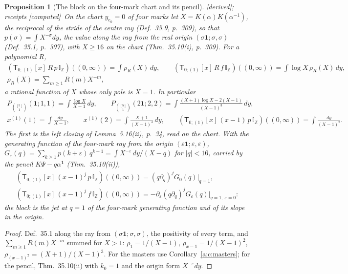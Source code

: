 \documentclass[11pt]{article}
\newcommand{\one}{\mathbf 1}
\newcommand{\sT}{\mathsf T}
\newcommand{\IZ}{\mathbb I_{\mathbb Z}}
\newcommand{\Tx}[3]{(\sT_{#1;(1)}[x]\,#2)((#3,\infty))}
\theoremstyle{plain}
\newtheorem{proposition}{Proposition}[section]
\theoremstyle{definition}
\theoremstyle{remark}
\newcommand{\derived}{\textup{[derived]}}
\newcommand{\computed}{\textup{[computed]}}
\begin{document}
\begin{proposition}[The block on the four-mark chart and its pencil]\label{a:p:chart}\derived; receipts \computed\
On the chart $y_{e_0}=0$ of four marks let $X=K(\alpha)K(\alpha^{-1})$, the reciprocal of the stride of the centre ray (Def.~35.9, p.~309), so that $p(\sigma)=\int X^{-\sigma}dy$, the value along the ray from the real origin $(\sigma\one;\sigma,\sigma)$ (Def.~35.1, p.~307), with $X\ge16$ on the chart (Thm.~35.10(i), p.~309). For a polynomial $R$,
\begin{gather*}
\Tx{0}{R\,p\,\IZ}{0}=\int\rho_R(X)\,dy,\qquad\Tx{0}{R\,f\,\IZ}{0}=\int\log X\,\rho_R(X)\,dy,\\
\rho_R(X)=\sum_{m\ge1}R(m)X^{-m},
\end{gather*}
a rational function of $X$ whose only pole is $X=1$. In particular
\begin{gather*}
P_{\binom{[5]}1}(\one;1,1)=\int\frac{\log X}{X-1}\,dy,\qquad P_{\binom{[5]}1}(2\one;2,2)=\int\frac{(X+1)\log X-2(X-1)}{(X-1)^3}\,dy,\\
x^{(1)}(1)=\int\frac{dy}{X-1},\qquad x^{(1)}(2)=\int\frac{X+1}{(X-1)^3}\,dy,\qquad \Tx{0}{(x-1)\,p\,\IZ}{0}=\int\frac{dy}{(X-1)^2}.
\end{gather*}
The first is the left closing of Lemma~5.16(ii), p.~34, read on the chart. With the generating function of the four-mark ray from the origin $(\varepsilon\one;\varepsilon,\varepsilon)$, $G_\varepsilon(q)=\sum_{k\ge1}p(k+\varepsilon)\,q^{k-1}=\int X^{-\varepsilon}\,dy/(X-q)$ for $|q|<16$, carried by the pencil $K\Psi-q\alpha^{\one}$ (Thm.~35.10(ii)),
\begin{gather*}
\Tx{0}{(x-1)^j\,p\,\IZ}{0}=(q\partial_q)^jG_0(q)\big|_{q=1},\\
\Tx{0}{(x-1)^j\,f\,\IZ}{0}=-\partial_\varepsilon(q\partial_q)^jG_\varepsilon(q)\big|_{q=1,\ \varepsilon=0}:
\end{gather*}
the block is the jet at $q=1$ of the four-mark generating function and of its slope in the origin.
\end{proposition}

\begin{proof}
Def.~35.1 along the ray from $(\sigma\one;\sigma,\sigma)$, the positivity of every term, and $\sum_{m\ge1}R(m)X^{-m}$ summed for $X>1$: $\rho_1=1/(X-1)$, $\rho_{x-1}=1/(X-1)^2$, $\rho_{(x-1)^2}=(X+1)/(X-1)^3$. For the masters use Corollary~\ref{a:c:masters}; for the pencil, Thm.~35.10(ii) with $k_0=1$ and the origin form $X^{-\varepsilon}dy$.
\end{proof}
\end{document}
